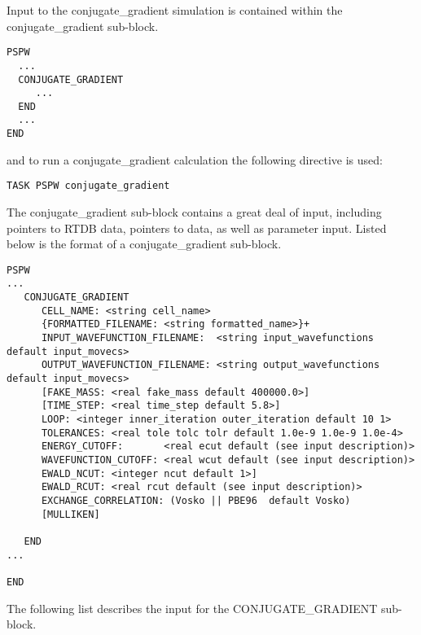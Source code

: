 Input to the conjugate\_gradient simulation is contained
within the conjugate\_gradient sub-block.
\begin{verbatim}
PSPW
  ...
  CONJUGATE_GRADIENT
     ...
  END
  ...
END
\end{verbatim}
and to run a conjugate\_gradient calculation the following directive is used:
\begin{verbatim}
TASK PSPW conjugate_gradient 
\end{verbatim}
The conjugate\_gradient sub-block contains a great deal
of input, including pointers to RTDB data, pointers to data, as well as
parameter input.  Listed below is the format of a conjugate\_gradient sub-block.
\begin{verbatim}
PSPW
...
   CONJUGATE_GRADIENT
      CELL_NAME: <string cell_name>
      {FORMATTED_FILENAME: <string formatted_name>}+
      INPUT_WAVEFUNCTION_FILENAME:  <string input_wavefunctions  default input_movecs>
      OUTPUT_WAVEFUNCTION_FILENAME: <string output_wavefunctions default input_movecs>
      [FAKE_MASS: <real fake_mass default 400000.0>]
      [TIME_STEP: <real time_step default 5.8>]
      LOOP: <integer inner_iteration outer_iteration default 10 1>
      TOLERANCES: <real tole tolc tolr default 1.0e-9 1.0e-9 1.0e-4>
      ENERGY_CUTOFF:       <real ecut default (see input description)>
      WAVEFUNCTION_CUTOFF: <real wcut default (see input description)>
      EWALD_NCUT: <integer ncut default 1>]
      EWALD_RCUT: <real rcut default (see input description)>
      EXCHANGE_CORRELATION: (Vosko || PBE96  default Vosko)
      [MULLIKEN]

   END
...

END
\end{verbatim}
The following list describes the input for the CONJUGATE\_GRADIENT
sub-block.
